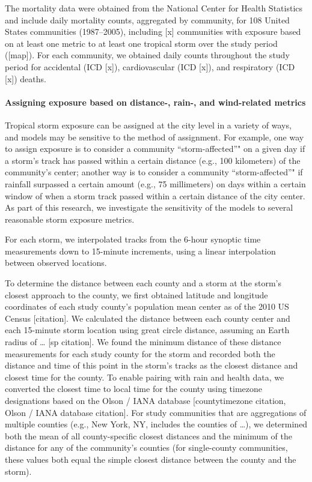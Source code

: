 \documentclass[]{elsarticle} %
\begin{document}
The mortality data were obtained from the National Center for Health
Statistics and include daily mortality counts, aggregated by community,
for 108 United States communities (1987--2005), including {[}x{]}
communities with exposure based on at least one metric to at least one
tropical storm over the study period ({[}map{]}). For each community, we
obtained daily counts throughout the study period for accidental (ICD
{[}x{]}), cardiovascular (ICD {[}x{]}), and respiratory (ICD {[}x{]})
deaths.

\paragraph{Assigning exposure based on distance-, rain-, and
wind-related
metrics}\label{assigning-exposure-based-on-distance--rain--and-wind-related-metrics}

Tropical storm exposure can be assigned at the city level in a variety
of ways, and models may be sensitive to the method of assignment. For
example, one way to assign exposure is to consider a community
``storm-affected''" on a given day if a storm's track has passed within
a certain distance (e.g., 100 kilometers) of the community's center;
another way is to consider a community ``storm-affected''" if rainfall
surpassed a certain amount (e.g., 75 millimeters) on days within a
certain window of when a storm track passed within a certain distance of
the city center. As part of this research, we investigate the
sensitivity of the models to several reasonable storm exposure metrics.

For each storm, we interpolated tracks from the 6-hour synoptic time
measurements down to 15-minute increments, using a linear interpolation
between observed locations.

To determine the distance between each county and a storm at the storm's
closest approach to the county, we first obtained latitude and longitude
coordinates of each study county's population mean center as of the 2010
US Census {[}citation{]}. We calculated the distance between each county
center and each 15-minute storm location using great circle distance,
assuming an Earth radius of \ldots{} {[}sp citation{]}. We found the
minimum distance of these distance measurements for each study county
for the storm and recorded both the distance and time of this point in
the storm's tracks as the closest distance and closest time for the
county. To enable pairing with rain and health data, we converted the
closest time to local time for the county using timezone designations
based on the Olson / IANA database {[}countytimezone citation, Olson /
IANA database citation{]}. For study communities that are aggregations
of multiple counties (e.g., New York, NY, includes the counties of
\ldots{}), we determined both the mean of all county-specific closest
distances and the minimum of the distance for any of the community's
counties (for single-county communities, these values both equal the
simple closest distance between the county and the storm).
\end{document}
